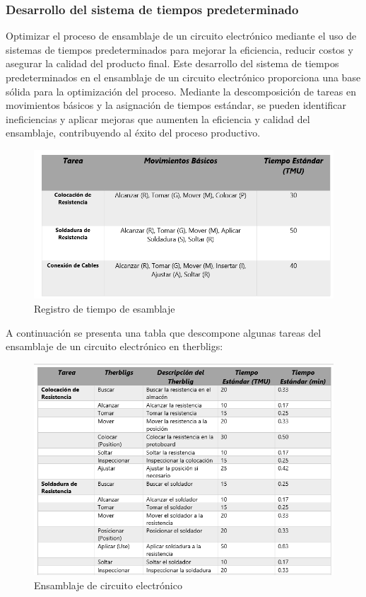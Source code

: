     \subsubsection{Desarrollo del sistema de tiempos predeterminado}
    
    Optimizar el proceso de ensamblaje de un circuito electrónico mediante el uso de sistemas de tiempos predeterminados para mejorar la eficiencia, reducir costos y asegurar la calidad del producto final.
    Este desarrollo del sistema de tiempos predeterminados en el ensamblaje de un circuito electrónico proporciona una base sólida para la optimización del proceso. Mediante la descomposición de tareas en movimientos básicos y la asignación de tiempos estándar, se pueden identificar ineficiencias y aplicar mejoras que aumenten la eficiencia y calidad del ensamblaje, contribuyendo al éxito del proceso productivo.
    
    \begin{figure}[H]
        \centering
    \includegraphics[scale=0.35]{1/img/Descompsicion del trabajo.png}
        \caption{Registro de tiempo de esamblaje}
    \end{figure}
    
    A continuación se presenta una tabla que descompone algunas tareas del ensamblaje de un circuito electrónico en therbligs:
    \begin{figure}[H]
        \centering
        \includegraphics[scale=0.40]{1/img/Ensamblaje de circuito electronico.png}
        \caption{Ensamblaje de circuito electrónico}
    \end{figure}
    
